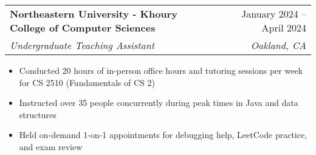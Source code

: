 \documentclass[letterpaper,11pt]{article}
\makeatletter
\newcommand{\resumeItem}[1]{
  \item\small{
    {#1 \vspace{-2pt}}
  }
}
\newcommand{\resumeSubheading}[4]{
  \vspace{-2pt}\item
    \begin{tabular*}{0.97\textwidth}[t]{l@{\extracolsep{\fill}}r}
      \textbf{#1} & #2 \\
      \textit{\small#3} & \textit{\small #4} \\
    \end{tabular*}\vspace{-7pt}
}
\newcommand{\resumeSubSubheading}[2]{
    \item
    \begin{tabular*}{0.97\textwidth}{l@{\extracolsep{\fill}}r}
      \textit{\small#1} & \textit{\small #2} \\
    \end{tabular*}\vspace{-7pt}
}
\newcommand{\resumeItemListStart}{\begin{itemize}}
\newcommand{\resumeItemListEnd}{\end{itemize}\vspace{-5pt}}
\makeatother
\begin{document}
    \resumeSubheading
      {Northeastern University - Khoury College of Computer Sciences}{January 2024 -- April 2024}
      {Undergraduate Teaching Assistant}{Oakland, CA}
      \resumeItemListStart
        \resumeItem{Conducted 20 hours of in-person office hours and tutoring sessions per week for CS 2510 (Fundamentals of CS 2)}
        \resumeItem{Instructed over 35 people concurrently during peak times in Java and data structures}
        \resumeItem{Held on-demand 1-on-1 appointments for debugging help, LeetCode practice, and exam review}
      \resumeItemListEnd







\end{document}
